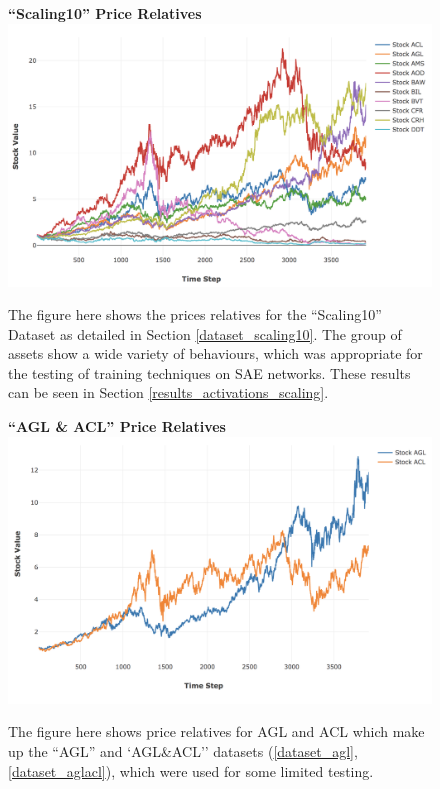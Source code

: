 \documentclass[a4paper,11pt,oneside]{article}
\theoremstyle{plain}
\theoremstyle{definition}
\begin{document}
	\begin{figure}[H]
		\centering
		\textbf{``Scaling10'' Price Relatives}
		\includegraphics[scale=0.45]{images/results/prices/scaling10_prices.png} 
		\caption[`Scaling10'' Price Relatives]{The figure here shows the prices relatives for the ``Scaling10'' Dataset as detailed in Section \ref{dataset_scaling10}. The group of assets show a wide variety of behaviours, which was appropriate for the testing of training techniques on SAE networks. These results can be seen in Section \ref{results_activations_scaling}.}
		\label{figure-scaling10_prices}
	\end{figure}
	
	\begin{figure}[H]
		\centering
		\textbf{``AGL \& ACL'' Price Relatives}
		\includegraphics[scale=0.45]{images/results/prices/aglacl_prices.png} 
		\caption[`AGL\&ACL'' Price Relatives]{The figure here shows price relatives for AGL and ACL which make up the ``AGL'' and `AGL\&ACL'' datasets (\ref{dataset_agl}, \ref{dataset_aglacl}), which were used for some limited testing.}
		\label{figure-aglacl_prices}
	\end{figure}
	
\end{document}
